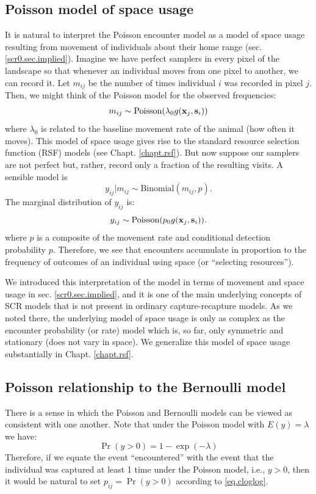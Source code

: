 \subsection{Poisson model of space usage}

It is natural to interpret the Poisson encounter model as a model of
space usage
resulting from movement of individuals
about their home range (sec. \ref{scr0.sec.implied}).  Imagine we have
perfect samplers in every pixel of the landscape so that whenever an
individual moves from one pixel to another, we can record it.
Let $m_{ij}$ be the number of
times individual $i$ was recorded in pixel $j$. Then, 
we might think of the Poisson model for the observed frequencies:
\[
m_{ij} \sim  \mbox{Poisson}( \lambda_{0} g({\bf x}_{j},{\bf s}_{i}) )
\]
where $\lambda_{0}$ is related to the baseline movement rate of the
animal (how often it moves). This model of
space usage gives rise to the standard resource selection function
(RSF) models (see Chapt. \ref{chapt.rsf}).
But now suppose our samplers are not perfect but, rather, record only
a fraction of the resulting visits. A sensible model is
\[
 y_{ij}|m_{ij} \sim \mbox{Binomial}(m_{ij}, p).
\]
The marginal distribution of $y_{ij}$ is:
\[
 y_{ij} \sim \mbox{Poisson}(p_{0} g({\bf x}_{j},{\bf s}_{i}) ).
\]
where $p$ is a composite of the movement rate and conditional
detection probability $p$. Therefore, we see that encounters accumulate in proportion to the
frequency of outcomes of an individual using space (or ``selecting
resources'').

We introduced this interpretation of the model in terms of movement
and space usage in sec. \ref{scr0.sec.implied}, and it is one of the
main underlying concepts of SCR models that is not present in ordinary
capture-recapture models. As we noted there, the underlying model
of space usage is only as complex as the encounter probability (or
rate) model which is, so far, only symmetric and stationary (does not
vary in space). We generalize this model of space usage 
substantially in Chapt. \ref{chapt.rsf}.



\subsection{Poisson relationship to the Bernoulli model}
\label{poisson-mn.sec.approx}

There is a sense in which the Poisson and Bernoulli models can
be viewed as consistent with one another. Note that under the Poisson
model with $E(y) = \lambda$ we have:
\begin{equation}
 \Pr(y>0) = 1-\exp(-\lambda)
\label{eq.cloglog}
\end{equation}
Therefore, if we equate the event ``encountered'' with the event that
the individual was captured at least 1 time under the Poisson model,
i.e., $y>0$, then it would be natural to set $p_{ij} = \Pr(y>0)$
according to \ref{eq.cloglog}.

